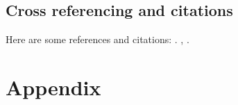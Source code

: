 \documentclass[english,counters by chapter]{uniud}
\begin{document}
\section{Cross referencing and citations}

Here are some references and citations: . , \cite{article,book,booklet,conference,inbook,incollection,manual,mastersthesis,misc,phdthesis,proceedings,techreport,unpublished}.



\printbibliography

\appendix

\chapter{Appendix}
\lipsum[1-7]
\end{document}
